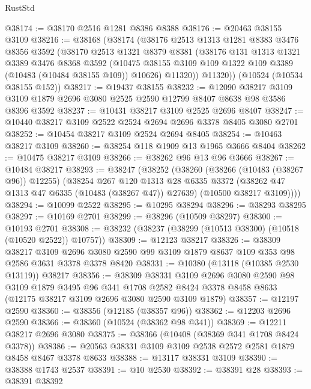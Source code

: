 \begin{lexlean}{RustStd}
\begin{coremodule}
@38174 := @38170 @2516 @1281 @8386 @8388
@38176 := @20463 @38155 @3109
@38216 := @38168
    (@38174
      (@38176
        @2513
        @1313
        @1281
        @8383
        @3476
        @8356
        @3592
        (@38170
          @2513
          @1321
          @8379
          @8381
          (@38176
            @131
            @1313
            @1321
            @3389
            @3476
            @8368
            @3592
            (@10475 @38155 @3109 @109 @1322 @109 @3389 (@10483 (@10484 @38155 @109)) @10626)
            @11320))
        @11320))
    (@10524 (@10534 @38155 @152))
@38217 := @19437 @38155
@38232 := @12090
    @38217
    @3109
    @3109
    @1879
    @2696
    @3080
    @2525
    @2590
    @12799
    @8407
    @8638
    @98
    @3586
    @8396
    @3592
@38237 := @10431 @38217 @3109 @2525 @2696 @8407
@38247 := @10440 @38217 @3109 @2522 @2524 @2694 @2696 @3378 @8405 @3080 @2701
@38252 := @10454 @38217 @3109 @2524 @2694 @8405
@38254 := @10463 @38217 @3109
@38260 := @38254 @118 @1909 @13 @1965 @3666 @8404
@38262 := @10475 @38217 @3109
@38266 := @38262 @96 @13 @96 @3666
@38267 := @10484 @38217
@38293 := @38247
    (@38252
      (@38260
        (@38266 (@10483 (@38267 @96)) @12255)
        (@38254
          @267
          @120
          @1313
          @28
          @6335
          @3372
          (@38262 @47 @1313 @47 @6335 (@10483 (@38267 @47)) @27639)
          (@10500 @38217 @3109))))
@38294 := @10099 @2522
@38295 := @10295 @38294
@38296 := @38293 @38295
@38297 := @10169 @2701
@38299 := @38296 (@10509 @38297)
@38300 := @10193 @2701
@38308 := @38232 (@38237 (@38299 (@10513 @38300) (@10518 (@10520 @2522)) @10757))
@38309 := @12123 @38217
@38326 := @38309
    @38217
    @3109
    @2696
    @3080
    @2590
    @99
    @3109
    @1879
    @8637
    @109
    @353
    @98
    @2586
    @3631
    @3378
    @3378
    @8420
@38331 := @10380 (@13118 (@10385 @2530 @13119)) @38217
@38356 := @38309
    @38331
    @3109
    @2696
    @3080
    @2590
    @98
    @3109
    @1879
    @3495
    @96
    @341
    @1708
    @2582
    @8424
    @3378
    @8458
    @8633
    (@12175 @38217 @3109 @2696 @3080 @2590 @3109 @1879)
@38357 := @12197 @2590
@38360 := @38356 (@12185 (@38357 @96))
@38362 := @12203 @2696 @2590
@38366 := @38360 (@10524 (@38362 @98 @341))
@38369 := @12211 @38217 @2696 @3080
@38375 := @38366 (@10408 (@38369 @341 @1708 @8424 @3378))
@38386 := @20563 @38331 @3109 @3109 @2538 @2572 @2581 @1879 @8458 @8467 @3378 @8633
@38388 := @13117 @38331 @3109
@38390 := @38388 @1743 @2537
@38391 := @10 @2530
@38392 := @38391 @28
@38393 := @38391 @38392

\end{coremodule}
\end{lexlean}
